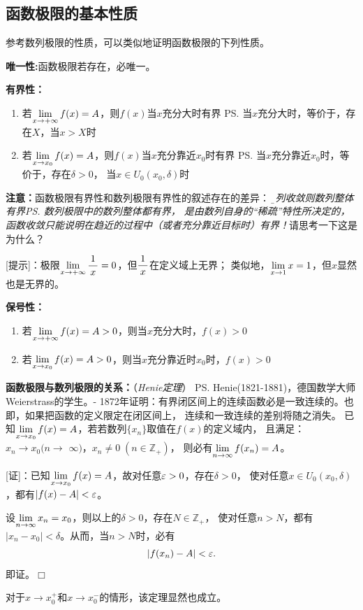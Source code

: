 \subsection{函数极限的基本性质}

参考数列极限的性质，可以类似地证明函数极限的下列性质。

{\bf 唯一性:}函数极限若存在，必唯一。

{\bf 有界性：}
\begin{enumerate}[(1)]
  \setlength{\itemindent}{1cm}
  \item 若$\lim\limits_{x\to{+\infty}}f(x)=A$，则$f(x)$当$x$充分大时有界
  \ps{当$x$充分大时，等价于，存在$X$，当$x>X$时}
  \item 若$\lim\limits_{x\to{x_0}}f(x)=A$，则$f(x)$当$x$充分靠近$x_0$时有界
  \ps{当$x$充分靠近$x_0$时，等价于，存在$\delta>0$，
  当$x\in U_0(x_0,\delta)$时}
\end{enumerate}

{\bf 注意：}函数极限有界性和数列极限有界性的叙述存在的差异：
{\it\b 数列收敛则数列整体有界\ps{数列极限中的数列整体都有界，
是由数列自身的“稀疏”特性所决定的}，
函数收敛只能说明在趋近的过程中（或者充分靠近目标时）有界！}请思考一下这是为什么？

[提示]：极限$\lim\limits_{x\to{+\infty}}\displaystyle\frac{\,{1}\,}{\,{x}\,}=0$，但$\displaystyle\frac{\,{1}\,}{\,{x}\,}$在定义域上无界；
类似地，$\lim\limits_{x\to{1}}x=1$，但$x$显然也是无界的。

{\bf 保号性：}
\begin{enumerate}[(1)]
  \setlength{\itemindent}{1cm}
  \item 若$\lim\limits_{x\to{+\infty}}f(x)=A>0$，则当$x$充分大时，$f(x)>0$
  \item 若$\lim\limits_{x\to{x_0}}f(x)=A>0$，则当$x$充分靠近时$x_0$时，$f(x)>0$
\end{enumerate}

{\bf 函数极限与数列极限的关系：}（{\it Henie定理}）
\ps{Henie(1821-1881)，德国数学大师Weierstrass的学生。-
1872年证明：有界闭区间上的连续函数必是一致连续的。也即，如果把函数的定义限定在闭区间上，
连续和一致连续的差别将随之消失。} 
已知$\lim\limits_{x\to{x_0}}f(x)=A$，若若数列$\{x_n\}$取值在$f(x)$的定义域内，
且满足：$x_n\to x_0(n\to$ $\infty)$，$x_n\ne 0\;(n\in\mathbb{Z}_+)$，
则必有$\lim\limits_{n\to\infty} f(x_n)=A$。

[证]：已知$\lim\limits_{x\to{x_0}}f(x)=A$，故对任意$\varepsilon>0$，存在$\delta>0$，
使对任意$x\in U_0(x_0,\delta)$，都有$|f(x)-A|<\varepsilon$。

设$\lim\limits_{n\to\infty} x_n=x_0$，则以上的$\delta>0$，存在$N\in\mathbb{Z}_+$，
使对任意$n>N$，都有$|x_n-x_0|<\delta$。从而，当$n>N$时，必有
$$|f(x_n)-A|<\varepsilon.$$
即证。\hfill $\Box$

对于$x\to x_0^+$和$x\to x_0^-$的情形，该定理显然也成立。


